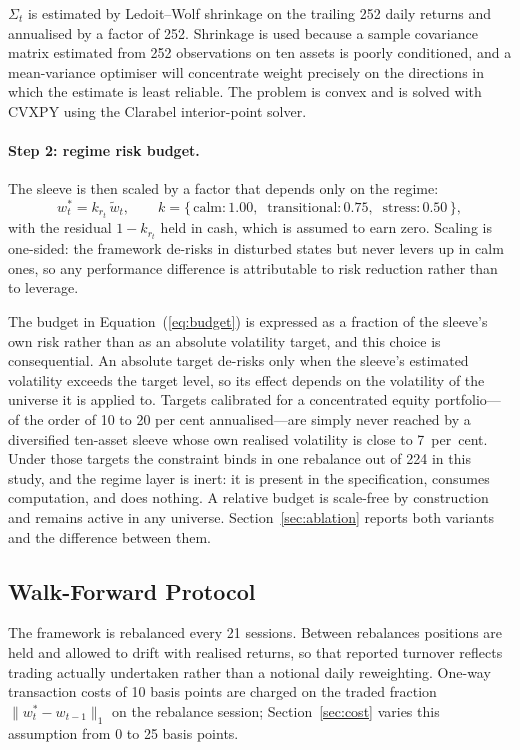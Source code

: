 \documentclass{singlecol-new}
\theoremstyle{TH}{
\newtheorem{lemma}{Lemma}
\newtheorem{theorem}[lemma]{Theorem}
\newtheorem{corrolary}[lemma]{Corrolary}
\newtheorem{conjecture}[lemma]{Conjecture}
\newtheorem{proposition}[lemma]{Proposition}
\newtheorem{claim}[lemma]{Claim}
\newtheorem{stheorem}[lemma]{Wrong Theorem}
\newtheorem{algorithm}{Algorithm}
}
\theoremstyle{THrm}{
\newtheorem{definition}{Definition}[section]
\newtheorem{question}{Question}[section]
\newtheorem{remark}{Remark}
\newtheorem{scheme}{Scheme}
}
\theoremstyle{THhit}{
\newtheorem{case}{Case}[section]
}
\begin{document}
$\Sigma_t$ is estimated by Ledoit--Wolf shrinkage \citep{ledoit04} on the trailing 252
daily returns and annualised by a factor of 252. Shrinkage is used because a sample
covariance matrix estimated from 252 observations on ten assets is poorly conditioned,
and a mean-variance optimiser will concentrate weight precisely on the directions in
which the estimate is least reliable. The problem is convex and is solved with CVXPY
using the Clarabel interior-point solver.

\paragraph{Step 2: regime risk budget.} The sleeve is then scaled by a factor that
depends only on the regime:
\begin{equation}
w^{\ast}_t = k_{r_t} \, \tilde{w}_t, \qquad
k = \{\,\text{calm}: 1.00, \;\; \text{transitional}: 0.75, \;\; \text{stress}: 0.50\,\},
\label{eq:budget}
\end{equation}
with the residual $1 - k_{r_t}$ held in cash, which is assumed to earn zero. Scaling is
one-sided: the framework de-risks in disturbed states but never levers up in calm ones,
so any performance difference is attributable to risk reduction rather than to leverage.

The budget in Equation~(\ref{eq:budget}) is expressed as a fraction of the sleeve's own
risk rather than as an absolute volatility target, and this choice is consequential.
An absolute target de-risks only when the sleeve's estimated volatility exceeds the
target level, so its effect depends on the volatility of the universe it is applied to.
Targets calibrated for a concentrated equity portfolio---of the order of 10 to 20 per
cent annualised---are simply never reached by a diversified ten-asset sleeve whose own
realised volatility is close to 7~per~cent. Under those targets the constraint binds in
one rebalance out of 224 in this study, and the regime layer is inert: it is present in
the specification, consumes computation, and does nothing. A relative budget is
scale-free by construction and remains active in any universe.
Section~\ref{sec:ablation} reports both variants and the difference between them.

\subsection{Walk-Forward Protocol}

The framework is rebalanced every 21 sessions. Between rebalances positions are held
and allowed to drift with realised returns, so that reported turnover reflects trading
actually undertaken rather than a notional daily reweighting. One-way transaction costs
of 10 basis points are charged on the traded fraction $\|w^{\ast}_t - w_{t-1}\|_1$ on
the rebalance session; Section~\ref{sec:cost} varies this assumption from 0 to 25 basis
points.
\end{document}
